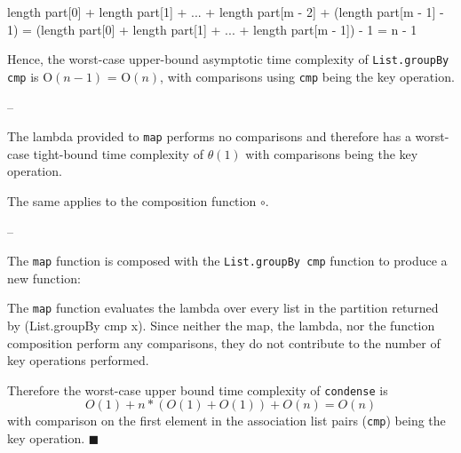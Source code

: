 \documentclass[../main.tex]{subfiles}
\begin{document}
\begin{code}
length part[0] + length part[1] + ... + length part[m - 2]
  + (length part[m - 1] - 1)
= (length part[0] + length part[1] + ... + length part[m - 1]) - 1
= n - 1
\end{code}

Hence, the worst-case upper-bound asymptotic time complexity of \texttt{List.groupBy cmp} is O$(n - 1)$ = O$(n)$, with comparisons using \texttt{cmp} being the key operation.
\qedsymbol

--

The lambda provided to \texttt{map} performs no comparisons and therefore has a worst-case tight-bound time complexity of
$\theta(1)$ with comparisons being the key operation.

The same applies to the composition function $\circ$.

--








The \texttt{map} function is composed with the \texttt{List.groupBy cmp} function to produce a new function:

The \texttt{map} function evaluates the lambda over every list in the partition returned by (List.groupBy cmp x).  Since
neither the map, the lambda, nor the function composition perform any comparisons, they do not contribute to the number
of key operations performed.

Therefore the worst-case upper bound time complexity of \texttt{condense} is \[O(1) + n*(O(1) + O(1)) + O(n) = O(n)\] with comparison on the first element in
the association list pairs (\texttt{cmp}) being the key operation.
$\blacksquare$
\end{document}
